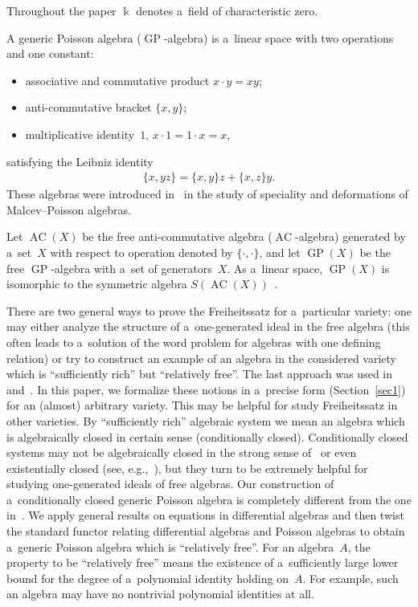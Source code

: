 Throughout the paper $\Bbbk $ denotes a~f\/ield of characteristic zero.

A generic Poisson algebra ($\operatorname{GP}$-algebra) is a~linear space with two operations and one constant:
\begin{itemize}\itemsep=0pt
\item associative and commutative product $x\cdot y = xy$;
\item anti-commutative bracket $\{x,y \}$;
\item multiplicative identity~$1$, $x\cdot 1 = 1\cdot x = x$,
\end{itemize}
satisfying the Leibniz identity
\begin{gather*}
\{x,yz\} = \{x,y\}z + \{x,z\}y.
\end{gather*}
These algebras were introduced in~\cite{Shest2000} in the study of speciality and deformations of Malcev--Poisson
algebras.

Let $\operatorname{AC}(X)$ be the free anti-commutative algebra ($\operatorname{AC}$-algebra) generated by a~set~$X$ with respect to operation denoted
by $\{\cdot,\cdot\}$, and let $\operatorname{GP}(X)$ be the free $\operatorname{GP}$-algebra with a~set of generators~$X$.
As a~linear space, $\operatorname{GP}(X)$ is isomorphic to the symmetric algebra $S(\operatorname{AC}(X))$~\cite{Shest1993}.

There are two general ways to prove the Freiheitssatz for a~particular variety: one may either analyze the structure of
a~one-generated ideal in the free algebra (this often leads to a~solution of the word problem for algebras with one
def\/ining relation) or try to construct an example of an algebra in the considered variety which is ``suf\/f\/iciently rich''
but ``relatively free''.
The last approach was used in~\cite{LML85} and~\cite{MLU10}.
In this paper, we formalize these notions in a~precise form (Section~\ref{sec1}) for an (almost) arbitrary variety.
This may be helpful for study Freiheitssatz in other varieties.
By ``suf\/f\/iciently rich'' algebraic system we mean an algebra which is algebraically closed in certain sense
(conditionally closed).
Conditionally closed systems may not be algebraically closed in the strong sense of~\cite{Bokut66} or even existentially
closed (see, e.g.,~\cite{Higman}), but they turn to be extremely helpful for studying one-generated ideals of free
algebras.
Our construction of a~conditionally closed generic Poisson algebra is completely dif\/ferent from the one in~\cite{MLU10}.
We apply general results on equations in dif\/ferential algebras and then twist the standard functor relating dif\/ferential
algebras and Poisson algebras to obtain a~generic Poisson algebra which is ``relatively free''.
For an algebra~$A$, the property to be ``relatively free'' means the existence of a~suf\/f\/iciently large lower bound for
the degree of a~polynomial identity holding on~$A$.
For example, such an algebra may have no nontrivial polynomial identities at all.

